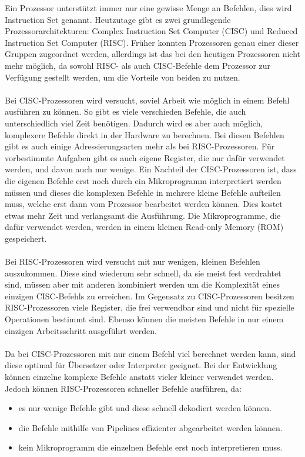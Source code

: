 \documentclass[12pt]{article}
\begin{document}
\noindent
Ein Prozessor unterstützt immer nur eine gewisse Menge an Befehlen, dies wird Instruction Set genannt. Heutzutage gibt es zwei grundlegende Prozessorarchitekturen: Complex Instruction Set Computer (CISC) und Reduced Instruction Set Computer (RISC). Früher konnten Prozessoren genau einer dieser Gruppen zugeordnet werden, allerdings ist das bei den heutigen Prozessoren nicht mehr möglich, da sowohl RISC- als auch CISC-Befehle dem Prozessor zur Verfügung gestellt werden, um die Vorteile von beiden zu nutzen.
\\\\
Bei CISC-Prozessoren wird versucht, soviel Arbeit wie möglich in einem Befehl ausführen zu können. So gibt es viele verschieden Befehle, die auch unterschiedlich viel Zeit benötigen. Dadurch wird es aber auch möglich, komplexere Befehle direkt in der Hardware zu berechnen. Bei diesen Befehlen gibt es auch einige Adressierungsarten mehr als bei RISC-Prozessoren. Für vorbestimmte Aufgaben gibt es auch eigene Register, die nur dafür verwendet werden, und davon auch nur wenige. Ein Nachteil der CISC-Prozessoren ist, dass die eigenen Befehle erst noch durch ein Mikroprogramm interpretiert werden müssen und dieses die komplexen Befehle in mehrere kleine Befehle aufteilen muss, welche erst dann vom Prozessor bearbeitet werden können. Dies kostet etwas mehr Zeit und verlangsamt die Ausführung. Die Mikroprogramme, die dafür verwendet werden, werden in einem kleinen Read-only Memory (ROM) gespeichert.
\\\\
Bei RISC-Prozessoren wird versucht mit nur wenigen, kleinen Befehlen auszukommen. Diese sind wiederum sehr schnell, da sie meist fest verdrahtet sind, müssen aber mit anderen kombiniert werden um die Komplexität eines einzigen CISC-Befehls zu erreichen.  Im Gegensatz zu CISC-Prozessoren besitzen RISC-Prozessoren viele Register, die frei verwendbar sind und nicht für spezielle Operationen bestimmt sind. Ebenso können die meisten Befehle in nur einem einzigen Arbeitsschritt ausgeführt werden.  \cite{Herold}
\\\\
Da bei CISC-Prozessoren mit nur einem Befehl viel berechnet werden kann, sind diese optimal für Übersetzer oder Interpreter geeignet. Bei der Entwicklung können einzelne komplexe Befehle anstatt vieler kleiner verwendet werden. Jedoch können RISC-Prozessoren schneller Befehle ausführen, da:

\begin{itemize}
\item es nur wenige Befehle gibt und diese schnell dekodiert werden können.
\item die Befehle mithilfe von Pipelines effizienter abgearbeitet werden können.
\item kein Mikroprogramm die einzelnen Befehle erst noch interpretieren muss.
\end{itemize}
\end{document}
